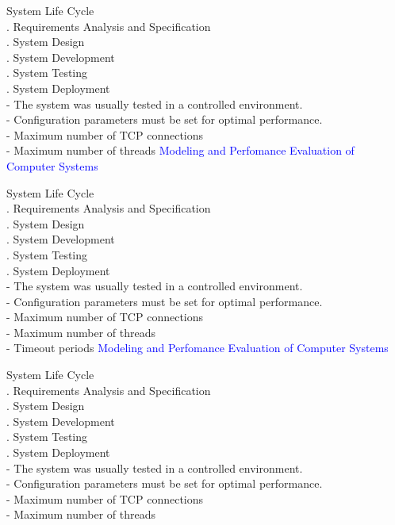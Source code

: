 \documentclass[svgnames]{beamer}
\begin{document}
\raggedright
\! System Life Cycle\\
. Requirements Analysis and Specification\\
. System Design\\
. System Development\\
. System Testing\\
. System Deployment\\[14pt]
 - The system was usually tested in a controlled environment.\\
 - Configuration parameters must be set for optimal performance.\\
 - Maximum number of TCP connections\\
 - Maximum number of threads
\newpage
\textcolor{blue}{Modeling and Perfomance Evaluation of Computer Systems} \\[38pt]
\raggedright
\! System Life Cycle\\
. Requirements Analysis and Specification\\
. System Design\\
. System Development\\
. System Testing\\
. System Deployment\\[14pt]
 - The system was usually tested in a controlled environment.\\
 - Configuration parameters must be set for optimal performance.\\
 - Maximum number of TCP connections\\
 - Maximum number of threads\\ 
 - Timeout periods 
\newpage
\textcolor{blue}{Modeling and Perfomance Evaluation of Computer Systems} \\[38pt]
\raggedright
\! System Life Cycle\\
. Requirements Analysis and Specification\\
. System Design\\
. System Development\\
. System Testing\\
. System Deployment\\[14pt]
 - The system was usually tested in a controlled environment.\\
 - Configuration parameters must be set for optimal performance.\\
 - Maximum number of TCP connections\\
 - Maximum number of threads\\  
\end{document}
